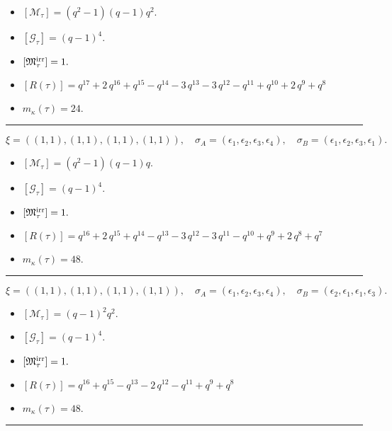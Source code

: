 \documentclass[10pt,a4paper]{amsart}
\begin{document}
\begin{itemize}
 \item $[\mathcal{M}_{\tau}] = {\left(q^{2} - 1\right)} {\left(q - 1\right)} q^{2} .$

 \item $[\mathcal{G}_{\tau}] = {\left(q - 1\right)}^{4} .$

 \item $[{\frak M}_{\tau}^{\textrm{irr}}] = 1 .$

 \item $[R(\tau)] = q^{17} + 2 \, q^{16} + q^{15} - q^{14} - 3 \, q^{13} - 3 \, q^{12} - q^{11} + q^{10} + 2 \, q^{9} + q^{8} $

 \item $m_{\kappa}(\tau) = 24 .$

 \end{itemize}
\noindent\rule{8cm}{0.4pt}

$$\xi = ({(1, 1), (1, 1)}, {(1, 1)}, {(1, 1)}),\quad \sigma_A = ({{\epsilon_1}, {\epsilon_2}}, {{\epsilon_3}}, {{\epsilon_4}}),\quad \sigma_B = ({{\epsilon_1}, {\epsilon_2}}, {{\epsilon_3}}, {{\epsilon_1}}).$$

\begin{itemize}
 \item $[\mathcal{M}_{\tau}] = {\left(q^{2} - 1\right)} {\left(q - 1\right)} q .$

 \item $[\mathcal{G}_{\tau}] = {\left(q - 1\right)}^{4} .$

 \item $[{\frak M}_{\tau}^{\textrm{irr}}] = 1 .$

 \item $[R(\tau)] = q^{16} + 2 \, q^{15} + q^{14} - q^{13} - 3 \, q^{12} - 3 \, q^{11} - q^{10} + q^{9} + 2 \, q^{8} + q^{7} $

 \item $m_{\kappa}(\tau) = 48 .$

 \end{itemize}
\noindent\rule{8cm}{0.4pt}

$$\xi = ({(1, 1), (1, 1)}, {(1, 1)}, {(1, 1)}),\quad \sigma_A = ({{\epsilon_1}, {\epsilon_2}}, {{\epsilon_3}}, {{\epsilon_4}}),\quad \sigma_B = ({{\epsilon_2}, {\epsilon_1}}, {{\epsilon_1}}, {{\epsilon_3}}).$$

\begin{itemize}
 \item $[\mathcal{M}_{\tau}] = {\left(q - 1\right)}^{2} q^{2} .$

 \item $[\mathcal{G}_{\tau}] = {\left(q - 1\right)}^{4} .$

 \item $[{\frak M}_{\tau}^{\textrm{irr}}] = 1 .$

 \item $[R(\tau)] = q^{16} + q^{15} - q^{13} - 2 \, q^{12} - q^{11} + q^{9} + q^{8} $

 \item $m_{\kappa}(\tau) = 48 .$

 \end{itemize}
\noindent\rule{8cm}{0.4pt}
\end{document}

